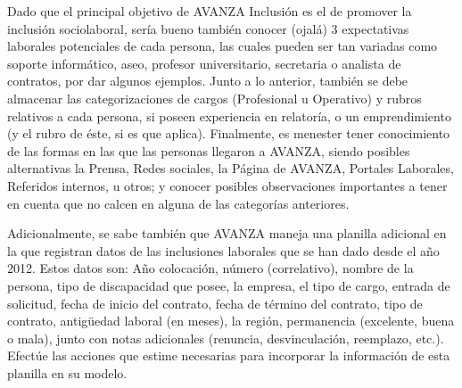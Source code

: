 \documentclass[letterpaper]{article}
\begin{document}
Dado que el principal objetivo de AVANZA Inclusión es el de promover la inclusión sociolaboral, sería bueno también conocer (ojalá) 3 expectativas laborales potenciales de cada persona, las cuales pueden ser tan variadas como soporte informático, aseo, profesor universitario, secretaria o analista de contratos, por dar algunos ejemplos. Junto a lo anterior, también se debe almacenar las categorizaciones de cargos (Profesional u Operativo) y rubros relativos a cada persona, si poseen experiencia en relatoría, o un emprendimiento (y el rubro de éste, si es que aplica). Finalmente, es menester tener conocimiento de las formas en las que las personas llegaron a AVANZA, siendo posibles alternativas la Prensa, Redes sociales, la Página de AVANZA, Portales Laborales, Referidos internos, u otros; y conocer posibles observaciones importantes a tener en cuenta que no calcen en alguna de las categorías anteriores.

Adicionalmente, se sabe también que AVANZA maneja una planilla adicional en la que registran datos de las inclusiones laborales que se han dado desde el año 2012. Estos datos son: Año colocación, número (correlativo), nombre de la persona, tipo de discapacidad que posee, la empresa, el tipo de cargo, entrada de solicitud, fecha de inicio del contrato, fecha de término del contrato, tipo de contrato, antigüedad laboral (en meses), la región, permanencia (excelente, buena o mala), junto con notas adicionales (renuncia, desvinculación, reemplazo, etc.). Efectúe las acciones que estime necesarias para incorporar la información de esta planilla en su modelo.
\end{document}
